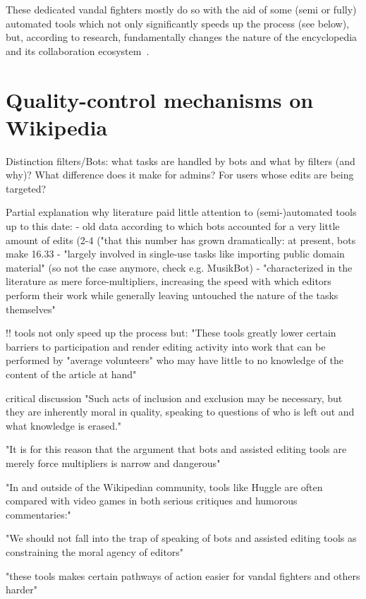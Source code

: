 These dedicated vandal fighters mostly do so with the aid of some (semi or fully) automated tools which not only significantly speeds up the process (see below),
but, according to research, fundamentally changes the nature of the encyclopedia and its collaboration ecosystem~\cite{GeiRib2010}.

\section{Quality-control mechanisms on Wikipedia}

Distinction filters/Bots: what tasks are handled by bots and what by filters (and why)? What difference does it make for admins? For users whose edits are being targeted?

\cite{GeiRib2010}
Partial explanation why literature paid little attention to (semi-)automated tools up to this date:
- old data according to which bots accounted for a very little amount of edits (2-4%
  ("that this number has grown
dramatically: at present, bots make 16.33%
- "largely involved in single-use tasks like importing public domain material" (so not the case anymore, check e.g. MusikBot)
- "characterized in the literature as mere force-multipliers,
increasing the speed with which editors perform their work
while generally leaving untouched the nature of the tasks
themselves"

!! tools not only speed up the process but:
"These tools greatly lower certain barriers to participation and render editing
activity into work that can be performed by "average
volunteers" who may have little to no knowledge of the
content of the article at hand"

critical discussion
"Such acts of inclusion and exclusion may be necessary, but
they are inherently moral in quality, speaking to questions of
who is left out and what knowledge is erased."

"It is for
this reason that the argument that bots and assisted editing
tools are merely force multipliers is narrow and dangerous"

"In and outside of the Wikipedian community, tools
like Huggle are often compared with video games in both
serious critiques and humorous commentaries:"

"We should not fall into the trap of speaking of bots and
assisted editing tools as constraining the moral agency of
editors"

"these tools makes certain pathways of action easier for vandal
fighters and others harder"

